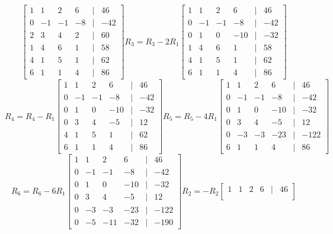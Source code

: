 \documentclass[11pt]{article}
\begin{document}
\begin{enumerate}
\begin{enumerate}
\[\begin{bmatrix}
    1 & 1 & 2 & 6 &|& 46 \\
    0 & -1 & -1 & -8 &|& -42 \\
    2 & 3 & 4 & 2 &|& 60 \\
    1 & 4 & 6 & 1 &|& 58 \\
    4 & 1 & 5 & 1 &|& 62 \\
    6 & 1 & 1 & 4 &|& 86
\end{bmatrix}
R_3 = R_3 - 2R_1
\begin{bmatrix}
    1 & 1 & 2 & 6 &|& 46 \\
    0 & -1 & -1 & -8 &|& -42 \\
    0 & 1 & 0 & -10 &|& -32 \\
    1 & 4 & 6 & 1 &|& 58 \\
    4 & 1 & 5 & 1 &|& 62 \\
    6 & 1 & 1 & 4 &|& 86
\end{bmatrix}
\]
\[
R_4 = R_4 - R_1
\begin{bmatrix}
    1 & 1 & 2 & 6 &|& 46 \\
    0 & -1 & -1 & -8 &|& -42 \\
    0 & 1 & 0 & -10 &|& -32 \\
    0 & 3 & 4 & -5 &|& 12 \\
    4 & 1 & 5 & 1 &|& 62 \\
    6 & 1 & 1 & 4 &|& 86
\end{bmatrix}
R_5 = R_5 - 4R_1
\begin{bmatrix}
    1 & 1 & 2 & 6 &|& 46 \\
    0 & -1 & -1 & -8 &|& -42 \\
    0 & 1 & 0 & -10 &|& -32 \\
    0 & 3 & 4 & -5 &|& 12 \\
    0 & -3 & -3 & -23 &|& -122 \\
    6 & 1 & 1 & 4 &|& 86
\end{bmatrix}
\]
\[
    R_6 = R_6 - 6R_1
    \begin{bmatrix}
        1 & 1 & 2 & 6 &|& 46 \\
        0 & -1 & -1 & -8 &|& -42 \\
        0 & 1 & 0 & -10 &|& -32 \\
        0 & 3 & 4 & -5 &|& 12 \\
        0 & -3 & -3 & -23 &|& -122 \\
        0 & -5 & -11 & -32 &|& -190
    \end{bmatrix}
    R_2 = -R_2
    \begin{bmatrix}
        1 & 1 & 2 & 6 &|& 46 \\

\end{bmatrix}\]
\end{enumerate}
\end{enumerate}
\end{document}
